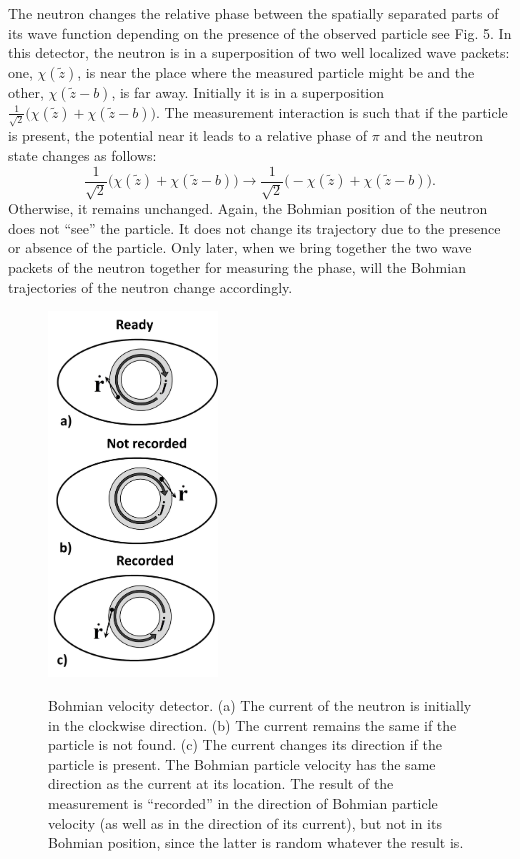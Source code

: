 \documentclass[12pt,preprint,tightenlines]{elsarticle}
\begin{document}
The neutron changes the relative
phase between the spatially separated parts of its wave function depending
on the presence of the observed particle see Fig. 5. In this detector, the neutron
is in a superposition of two well localized wave packets: one, $\chi(\tilde{z})$,
is near the place where the measured particle might be and the other,
$\chi(\tilde{z}-b)$, is  far away. Initially it is in
a superposition $\frac{1}{\sqrt{2}} \Big(\chi(\tilde{z})+\chi(\tilde{z}-b) \Big)$.
The measurement interaction is such that if the particle is present,
the potential near it leads to a relative phase of $\pi$ and the
neutron state changes as follows:
 \begin{equation}
\frac{1}{\sqrt{2}}\Big(\chi(\tilde{z})+\chi(\tilde{z}-b)\Big ) \rightarrow \frac{1}{\sqrt{2}}\Big(-\chi(\tilde{z})+\chi(\tilde{z}-b)\Big ).\label{phasedet}\end{equation}
 Otherwise, it remains unchanged. Again, the Bohmian position of the
neutron does not ``see'' the particle. It does not change its
trajectory due to the presence or absence of the particle. Only later,
when we bring together the two wave packets of the neutron together
for measuring the phase, will the Bohmian trajectories of the neutron
change accordingly.


\begin{figure}[H]
  \includegraphics[width=4.5cm]{6.pdf}\\ \vspace{-6pt}
    \caption{ Bohmian velocity detector. (a) The current of the neutron is initially in the clockwise direction. (b) The current remains the same if the particle is not found. (c) The current changes its direction if the particle is present.  The Bohmian particle  velocity  has the same direction as the current at its location. The result of the measurement is ``recorded'' in the direction of Bohmian particle velocity (as well as in the direction of its current), but not in its Bohmian position, since the latter is random whatever the result is.}
\end{figure}
\end{document}
